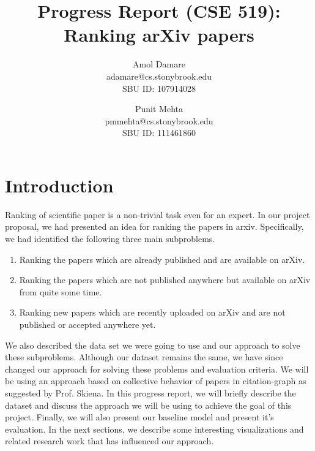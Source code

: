 \documentclass[a4paper, 11pt]{article}
\begin{document}
\title{Progress Report (CSE 519): Ranking arXiv papers}

\author{Amol Damare \\ adamare@cs.stonybrook.edu \\SBU ID: 107914028
\and
Punit Mehta \\  pmmehta@cs.stonybrook.edu \\SBU ID: 111461860}
\maketitle

\section{Introduction}
Ranking of scientific paper is a non-trivial task even for an expert. In our project proposal, we had presented an idea for ranking the papers in arxiv. Specifically, we had identified the following three main subproblems. \\
\begin{enumerate}
\item Ranking the papers which are already published and are available on arXiv.
\item Ranking the papers which are not published anywhere but available on arXiv from quite some time.
\item Ranking new papers which are recently uploaded on arXiv and are not published or accepted anywhere yet.
\end{enumerate}
We also described the data set we were going to use and our approach to solve these subproblems. Although our dataset remains the same, we have since changed our approach for solving these problems and evaluation criteria. We will be using  an approach based on collective behavior of papers in citation-graph as suggested by Prof. Skiena. In this progress report, we will briefly describe the dataset and discuss the approach we will be using to achieve the goal of this project. Finally, we will also present our baseline model and present it's evaluation. In the next sections, we describe some interesting visualizations and related research work  that has influenced our approach.
\end{document}
